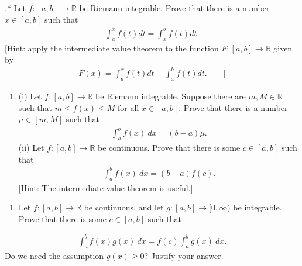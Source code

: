 \documentclass[letterpaper,10pt,english]{jupyterBook}
\begin{document}
\label{\detokenize{Problems:id75}}
.* Let \(f\colon [a,b]\rightarrow \mathbb{R}\) be Riemann integrable. Prove that there is a number \(x\in [a,b]\) such that
\begin{equation*}
\begin{split}
\int_a^x f(t)dt = \int_x^b f(t)dt.
\end{split}
\end{equation*}
\sphinxAtStartPar
{[}Hint: apply the intermediate value theorem to the function \(F:[a,b]\to\mathbb{R}\) given by
\begin{equation*}
\begin{split}
F(x) = \int_a^x f(t)dt - \int_x^b f(t)dt .\qquad ]
\end{split}
\end{equation*}\label{\detokenize{Problems:id76}}\begin{enumerate}
%
\setcounter{enumi}{75}
\item {} 
\sphinxAtStartPar
(i) Let \(f\colon [a,b]\rightarrow \mathbb{R}\) be Riemann integrable. Suppose there are \(m,M\in \mathbb{R}\) such that \(m\leq f(x)\leq M\) for all \(x\in [a,b]\). Prove that there is a number \(\mu \in [m,M]\) such that
\begin{equation*}
\begin{split}
    \int_a^b f(x)\ dx = (b-a)\mu .
    \end{split}
\end{equation*}
\sphinxAtStartPar
(ii) Let \(f\colon [a,b]\rightarrow \mathbb{R}\) be continuous. Prove that there is some \(c \in [a,b]\) such that
\begin{equation*}
\begin{split}
    \int_a^b f(x)\ dx = (b-a)f(c) .
    \end{split}
\end{equation*}
\sphinxAtStartPar
{[}Hint: The intermediate value theorem is useful.{]}

\end{enumerate}
\label{\detokenize{Problems:id77}}\begin{enumerate}
%
\setcounter{enumi}{76}
\item {} 
\sphinxAtStartPar
Let \(f\colon [a,b]\rightarrow \mathbb{R}\) be continuous, and let \(g\colon [a,b]\rightarrow [0,\infty )\) be integrable. Prove that there is some \(c \in [a,b]\) such that

\end{enumerate}
\begin{equation*}
\begin{split}
\int_a^b f(x)g(x)\ dx = f(c) \int_a^b g(x)\ dx .
\end{split}
\end{equation*}
\sphinxAtStartPar
Do we need the assumption \(g(x)\geq 0\)? Justify your answer.
\end{document}
